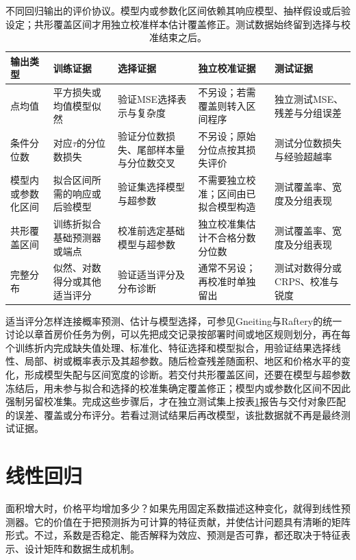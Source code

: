 \begin{table}[htbp]
  \centering
  \small
  \begin{tabularx}{\linewidth}{@{}>{\RaggedRight\arraybackslash}p{20mm}XXXX@{}}
    \toprule
    输出类型 & 训练证据 & 选择证据 & 独立校准证据 & 测试证据 \\
    \midrule
    点均值 & 平方损失或均值模型似然 & 验证MSE选择表示与复杂度 & 不另设；若需覆盖则转入区间程序 & 独立测试MSE、残差与分组误差 \\
    条件分位数 & 对应$\tau$的分位数损失 & 验证分位数损失、尾部样本量与分位数交叉 & 不另设；原始分位点按其损失评价 & 测试分位数损失与经验超越率 \\
    模型内或参数化区间 & 拟合区间所需的响应或后验模型 & 验证集选择模型与超参数 & 不需要独立校准；区间由已拟合模型构造 & 测试覆盖率、宽度及分组表现 \\
    共形覆盖区间 & 训练折拟合基础预测器或端点 & 校准前选定基础模型与超参数 & 独立校准集估计不合格分数分位数 & 测试覆盖率、宽度及分组表现 \\
    完整分布 & 似然、对数得分或其他适当评分 & 验证适当评分及分布诊断 & 通常不另设；再校准时单独留出 & 测试对数得分或CRPS、校准与锐度 \\
    \bottomrule
  \end{tabularx}
  \caption{不同回归输出的评价协议。模型内或参数化区间依赖其响应模型、抽样假设或后验设定；共形覆盖区间才用独立校准样本估计覆盖修正。测试数据始终留到选择与校准结束之后。}
  \label{tab:regression-evaluation-protocol}
\end{table}

适当评分怎样连接概率预测、估计与模型选择，可参见Gneiting与Raftery的统一讨论以章首房价任务为例，可以先把成交记录按部署时间或地区规则划分，再在每个训练折内完成缺失值处理、标准化、特征选择和模型拟合，用验证结果选择线性、局部、树或概率表示及其超参数。随后检查残差随面积、地区和价格水平的变化，形成模型失配与区间宽度的诊断。若交付共形覆盖区间，还要在模型与超参数冻结后，用未参与拟合和选择的校准集确定覆盖修正；模型内或参数化区间不因此强制另留校准集。完成这些步骤后，才在独立测试集上按表\ref{tab:regression-evaluation-protocol}报告与交付对象匹配的误差、覆盖或分布评分。若看过测试结果后再改模型，该批数据就不再是最终测试证据。

\section{线性回归}
\label{sec:regression-linear}

面积增大时，价格平均增加多少？如果先用固定系数描述这种变化，就得到线性预测器。它的价值在于把预测拆为可计算的特征贡献，并使估计问题具有清晰的矩阵形式。不过，系数是否稳定、能否解释为效应、预测是否可靠，都还取决于特征表示、设计矩阵和数据生成机制。

